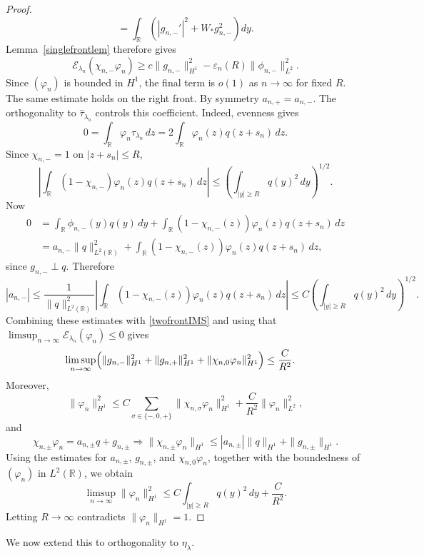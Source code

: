 \documentclass[11pt,a4paper]{article}
\numberwithin{equation}{section}
\theoremstyle{plain}
\theoremstyle{remark}
\begin{document}
\begin{proof}
$$=
\int_{\mathbb R}
\left(
|g_{n,-}'|^2+W_*g_{n,-}^2
\right)dy.
$$
Lemma~\ref{singlefrontlem} therefore gives
$$
\mathcal E_{\lambda_n}(\chi_{n,-}\varphi_n)
\geq
c\|g_{n,-}\|_{H^1}^2
-
\varepsilon_n(R)\|\phi_{n,-}\|_{L^2}^2.
$$
Since $(\varphi_n)$ is bounded in $H^1$, the final term is $o(1)$ as $n\to\infty$
for fixed $R$. The same estimate holds on the right front. By symmetry $a_{n,+}=a_{n,-}$. The orthogonality to $\widehat{\tau}_{\lambda_n}$ controls this coefficient.
Indeed, evenness gives
$$
0
=
\int_{\mathbb R}\varphi_n\widehat{\tau}_{\lambda_n}\,dz
=
2\int_{\mathbb R}\varphi_n(z)q(z+s_n)\,dz.
$$
Since $\chi_{n,-}=1$ on $|z+s_n|\leq R$,
$$
\left|
\int_{\mathbb R}
(1-\chi_{n,-})\varphi_n(z)q(z+s_n)\,dz
\right|
\leq
\left(
\int_{|y|\geq R}q(y)^2\,dy
\right)^{1/2}.
$$
Now
$$
\begin{aligned}
0
&=
\int_{\mathbb R}\phi_{n,-}(y)q(y)\,dy
+
\int_{\mathbb R}
(1-\chi_{n,-}(z))
\varphi_n(z)q(z+s_n)\,dz\\
&=
a_{n,-}\|q\|_{L^2(\mathbb R)}^2
+
\int_{\mathbb R}
(1-\chi_{n,-}(z))
\varphi_n(z)q(z+s_n)\,dz,
\end{aligned}
$$
since $g_{n,-}\perp q$. Therefore
$$
|a_{n,-}|
\leq
\frac{1}{\|q\|_{L^2(\mathbb R)}^2}
\left|
\int_{\mathbb R}
(1-\chi_{n,-}(z))
\varphi_n(z)q(z+s_n)\,dz
\right|
\leq
C
\left(
\int_{|y|\geq R}q(y)^2\,dy
\right)^{1/2}.
$$
Combining these estimates with \eqref{twofrontIMS} and using that $\limsup_{n\to\infty}\mathcal E_{\lambda_n}(\varphi_n)\leq0$ gives
$$
\begin{aligned}
\limsup_{n\to\infty}
\Bigl(
&\|g_{n,-}\|_{H^1}^2
+
\|g_{n,+}\|_{H^1}^2
+
\|\chi_{n,0}\varphi_n\|_{H^1}^2
\Bigr)
\leq
\frac{C}{R^2}.
\end{aligned}
$$
Moreover,
$$
\|\varphi_n\|_{H^1}^2
\leq
C\sum_{\sigma\in\{-,0,+\}}
\|\chi_{n,\sigma}\varphi_n\|_{H^1}^2
+
\frac{C}{R^2}\|\varphi_n\|_{L^2}^2,
$$
and
$$
\chi_{n,\pm}\varphi_n
=
a_{n,\pm}q+g_{n,\pm}\Rightarrow\|\chi_{n,\pm}\varphi_n\|_{H^1}
\leq
|a_{n,\pm}|\|q\|_{H^1}
+
\|g_{n,\pm}\|_{H^1}.
$$
Using the estimates for $a_{n,\pm}$, $g_{n,\pm}$, and
$\chi_{n,0}\varphi_n$, together with the boundedness of
$(\varphi_n)$ in $L^2(\mathbb R)$, we obtain
$$
\limsup_{n\to\infty}\|\varphi_n\|_{H^1}^2
\leq
C
\int_{|y|\geq R}q(y)^2\,dy
+
\frac{C}{R^2}.
$$
Letting $R\to\infty$ contradicts
$\|\varphi_n\|_{H^1}=1$.
\end{proof}
\noindent
We now extend this to orthogonality to $\eta_\lambda$.
\end{document}
